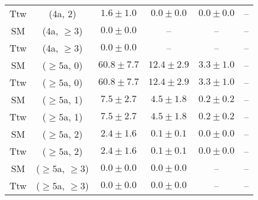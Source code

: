 \begin{table}[h!]
{\begin{tabular}{cccccc}
	Ttw & (4a, 2) & $1.6\pm 1.0$ & $0.0\pm 0.0$ & $0.0\pm 0.0$ & -- \\[0.5ex] 
	SM & (4a, $\ge3$) & $0.0\pm 0.0$ & -- & -- & -- \\[0.5ex] 
	Ttw & (4a, $\ge3$) & $0.0\pm 0.0$ & -- & -- & -- \\[0.5ex] 
	SM & ($\ge5$a, 0) & $60.8\pm 7.7$ & $12.4\pm 2.9$ & $3.3\pm 1.0$ & -- \\[0.5ex] 
	Ttw & ($\ge5$a, 0) & $60.8\pm 7.7$ & $12.4\pm 2.9$ & $3.3\pm 1.0$ & -- \\[0.5ex] 
	SM & ($\ge5$a, 1) & $7.5\pm 2.7$ & $4.5\pm 1.8$ & $0.2\pm 0.2$ & -- \\[0.5ex] 
	Ttw & ($\ge5$a, 1) & $7.5\pm 2.7$ & $4.5\pm 1.8$ & $0.2\pm 0.2$ & -- \\[0.5ex] 
	SM & ($\ge5$a, 2) & $2.4\pm 1.6$ & $0.1\pm 0.1$ & $0.0\pm 0.0$ & -- \\[0.5ex] 
	Ttw & ($\ge5$a, 2) & $2.4\pm 1.6$ & $0.1\pm 0.1$ & $0.0\pm 0.0$ & -- \\[0.5ex] 
	SM & ($\ge5$a, $\ge3$) & $0.0\pm 0.0$ & $0.0\pm 0.0$ & -- & -- \\[0.5ex] 
	Ttw & ($\ge5$a, $\ge3$) & $0.0\pm 0.0$ & $0.0\pm 0.0$ & -- & -- \\[0.5ex] 
	\hline
	\hline
\end{tabular}}
\end{table}
